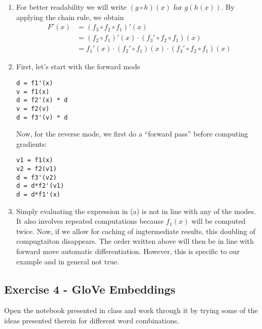 \documentclass[
  letterpaper,
  DIV=11,
  numbers=noendperiod]{scrartcl}
\begin{document}
\begin{enumerate}
\def\labelenumi{(\alph{enumi})}
\item
  For better readability we will write \((g\circ h)(x)\) for
  \(g(h(x))\). By applying the chain rule, we obtain \[
  \begin{aligned}
  F'(x) 
   &= (f_3 \circ f_2 \circ f_1)' (x) \\
   &= (f_2 \circ f_1)'(x) 
  \cdot (f_3' \circ f_2 \circ f_1)(x)\\
  &= f_1'(x) \cdot (f_2' \circ f_1)(x) 
  \cdot (f_3' \circ f_2 \circ f_1)(x)
  \end{aligned}
  \]
\item
  First, let's start with the forward mode

\begin{verbatim}
d = f1'(x)
v = f1(x)
d = f2'(x) * d
v = f2(v)
d = f3'(v) * d
\end{verbatim}

  Now, for the reverse mode, we first do a ``forward pass'' before
  computing gradients:

\begin{verbatim}
v1 = f1(x)
v2 = f2(v1)
d = f3'(v2)
d = d*f2'(v1)
d = d*f1'(x)
\end{verbatim}
\item
  Simply evaluating the expression in (a) is not in line with any of the
  modes. It also involves repeated computations because \(f_1(x)\) will
  be computed twice. Now, if we allow for caching of ingtermediate
  results, this doubling of compugtaiton disappears. The order written
  above will then be in line with forward move automatic
  differentiation. However, this is specific to our example and in
  general not true.
\end{enumerate}

\subsection{Exercise 4 - GloVe
Embeddings}\label{exercise-4---glove-embeddings}

Open the notebook presented in class and work through it by trying some
of the ideas presented therein for different word combinations.
\end{document}
